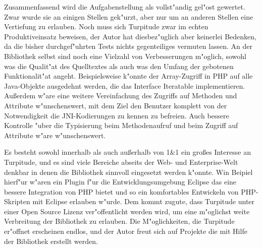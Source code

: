 Zusammenfassend wird die Aufgabenstellung als vollst"andig gel"ost gewertet. Zwar wurde sie an einigen Stellen
gek"urzt, aber nur um an anderen Stellen eine Vertiefung zu erlauben.
Noch muss sich Turpitude zwar im echten Produktiveinsatz beweisen, der Autor hat diesbez"uglich aber keinerlei Bedenken,
da die bisher durchgef"uhrten Tests nichts gegenteiliges vermuten lassen.
An der Bibliothek selbst sind noch eine Vielzahl von Verbesserungen m"oglich, sowohl was die Qualit"at des Quelltextes
als auch was den Umfang der gebotenen Funktionalit"at angeht. Beispielsweise k"onnte der Array-Zugriff in PHP auf alle
Java-Objekte ausgedehnt werden, die das Interface Iteratable implementieren. Au\ss erdem w"are eine weitere Vereinfachung
des Zugriffs auf Methoden und Attribute w"unschenswert, mit dem Ziel den Benutzer komplett von der Notwendigkeit die
JNI-Kodierungen zu kennen zu befreien. Auch bessere Kontrolle "uber die Typisierung beim Methodenaufruf und beim Zugriff
auf Attribute w"are w"unschenswert.

Es besteht sowohl innerhalb als auch au\ss erhalb von 1\&1 ein gro\ss es Interesse an Turpitude, und es sind viele Bereiche
abseits der Web- und Enterprise-Welt denkbar in denen die Bibliothek sinnvoll eingesetzt werden k"onnte. Win Beipiel hierf"ur
w"aren ein Plugin f"ur die Entwicklungsumgebung Eclipse das eine bessere Integration von PHP bietet und so ein komfortables
Entwickeln von PHP-Skripten mit Eclipse erlauben w"urde. Dem kommt zugute, dass Turpitude unter einer Open Source Lizenz ver"offentlicht
werden wird, um eine m"oglichst weite Verbreitung der Bibliothek zu erlauben.
Die M"oglichkeiten, die Turpitude er"offnet erscheinen endlos, und der Autor freut sich auf Projekte die mit 
Hilfe der Bibliothek erstellt werden.


